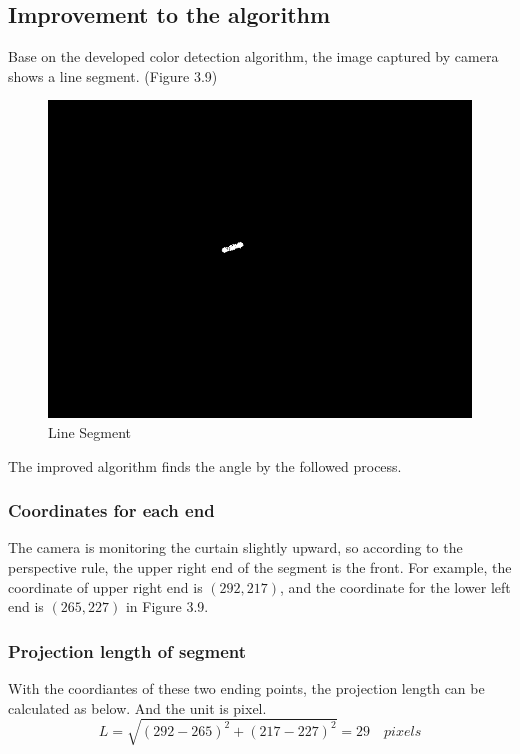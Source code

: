 \documentclass[letterpaper,12pt,oneside]{book}
\begin{document}
		\subsection{Improvement to the algorithm}
		Base on the developed color detection algorithm, the image captured by camera shows a line segment. (Figure 3.9)
		\begin{figure}[ht!]
			\begin{center}
				\includegraphics[scale = 0.6]{segment.png}
				\caption{Line Segment}
			\end{center}
		\end{figure}
		The improved algorithm finds the angle by the followed process. 
		\subsubsection{Coordinates for each end}
		
		The camera is monitoring the curtain slightly upward, so according to the perspective rule, the upper right end of the segment is the front. For example, the coordinate of upper right end is $(292,217)$, and the coordinate for the lower left end is $(265, 227)$ in Figure 3.9.
			
		\subsubsection{Projection length of segment}
			
		With the coordiantes of these two ending points, the projection length can be calculated as below. And the unit is pixel. 
		\begin{equation}
			L = \sqrt{(292-265)^2+(217-227)^2} = 29 \quad pixels
		\end{equation}
			
\end{document}
